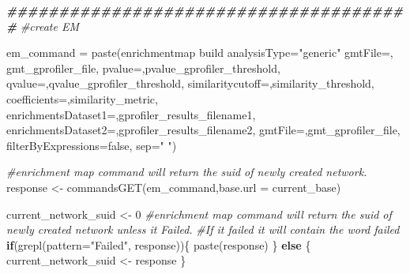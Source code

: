 \documentclass[
]{book}
\newenvironment{Shaded}{\begin{snugshade}}{\end{snugshade}}
\newcommand{\AttributeTok}[1]{\textcolor[rgb]{0.77,0.63,0.00}{#1}}
\newcommand{\CommentTok}[1]{\textcolor[rgb]{0.56,0.35,0.01}{\textit{#1}}}
\newcommand{\ControlFlowTok}[1]{\textcolor[rgb]{0.13,0.29,0.53}{\textbf{#1}}}
\newcommand{\DecValTok}[1]{\textcolor[rgb]{0.00,0.00,0.81}{#1}}
\newcommand{\DocumentationTok}[1]{\textcolor[rgb]{0.56,0.35,0.01}{\textbf{\textit{#1}}}}
\newcommand{\FunctionTok}[1]{\textcolor[rgb]{0.00,0.00,0.00}{#1}}
\newcommand{\NormalTok}[1]{#1}
\newcommand{\OtherTok}[1]{\textcolor[rgb]{0.56,0.35,0.01}{#1}}
\newcommand{\StringTok}[1]{\textcolor[rgb]{0.31,0.60,0.02}{#1}}
\begin{document}
\begin{Shaded}
\begin{Highlighting}[]
\DocumentationTok{\#\#\#\#\#\#\#\#\#\#\#\#\#\#\#\#\#\#\#\#\#\#\#\#\#\#\#\#\#\#\#\#\#\#\#\#\#\#\#}
\CommentTok{\#create EM}

\NormalTok{em\_command }\OtherTok{=} \FunctionTok{paste}\NormalTok{(}\StringTok{\textquotesingle{}enrichmentmap build analysisType="generic" gmtFile=\textquotesingle{}}\NormalTok{,}
\NormalTok{                   gmt\_gprofiler\_file,}
                   \StringTok{\textquotesingle{}pvalue=\textquotesingle{}}\NormalTok{,pvalue\_gprofiler\_threshold, }
                   \StringTok{\textquotesingle{}qvalue=\textquotesingle{}}\NormalTok{,qvalue\_gprofiler\_threshold,}
                   \StringTok{\textquotesingle{}similaritycutoff=\textquotesingle{}}\NormalTok{,similarity\_threshold,}
                   \StringTok{\textquotesingle{}coefficients=\textquotesingle{}}\NormalTok{,similarity\_metric,}
                   \StringTok{\textquotesingle{}enrichmentsDataset1=\textquotesingle{}}\NormalTok{,gprofiler\_results\_filename1, }
                   \StringTok{\textquotesingle{}enrichmentsDataset2=\textquotesingle{}}\NormalTok{,gprofiler\_results\_filename2,}
                   \StringTok{\textquotesingle{}gmtFile=\textquotesingle{}}\NormalTok{,gmt\_gprofiler\_file,}
                   \StringTok{\textquotesingle{}filterByExpressions=false\textquotesingle{}}\NormalTok{,}
                   \AttributeTok{sep=}\StringTok{" "}\NormalTok{)}

\CommentTok{\#enrichment map command will return the suid of newly created network.}
\NormalTok{response }\OtherTok{\textless{}{-}} \FunctionTok{commandsGET}\NormalTok{(em\_command,}\AttributeTok{base.url =}\NormalTok{ current\_base)}

\NormalTok{current\_network\_suid }\OtherTok{\textless{}{-}} \DecValTok{0}
\CommentTok{\#enrichment map command will return the suid of newly created network unless it Failed.  }
\CommentTok{\#If it failed it will contain the word failed}
\ControlFlowTok{if}\NormalTok{(}\FunctionTok{grepl}\NormalTok{(}\AttributeTok{pattern=}\StringTok{"Failed"}\NormalTok{, response))\{}
  \FunctionTok{paste}\NormalTok{(response)}
\NormalTok{\} }\ControlFlowTok{else}\NormalTok{ \{}
\NormalTok{  current\_network\_suid }\OtherTok{\textless{}{-}}\NormalTok{ response}
\NormalTok{\}}


\end{Highlighting}
\end{Shaded}
\end{document}
